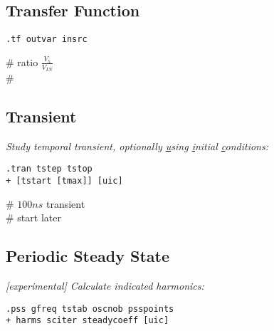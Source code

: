 \subsection*{Transfer Function}
\begin{lstlisting}
.tf outvar insrc
\end{lstlisting}
 \# {\scriptsize ratio $\frac{V_{5}}{V_{IN}}$}\\
 \# {\scriptsize }\\

\subsection*{Transient}
\textit{Study temporal transient, optionally \underline{u}sing \underline{i}nitial \underline{c}onditions:}\\
\begin{lstlisting}
.tran tstep tstop 
+ [tstart [tmax]] [uic]
\end{lstlisting}
 \# {\scriptsize $100ns$ transient}\\
 \# {\scriptsize start later}\\

\subsection*{Periodic Steady State}
\textit{[experimental] Calculate indicated harmonics:}\\
\begin{lstlisting}
.pss gfreq tstab oscnob psspoints
+ harms sciter steadycoeff [uic]
\end{lstlisting}
 \\
 \\
